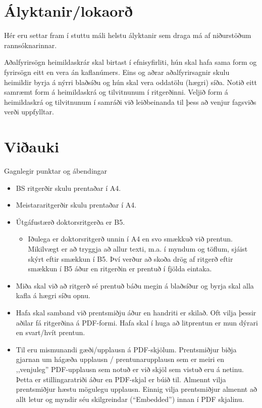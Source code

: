 \documentclass[a4paper, 12pt, twoside]{scrreprt}
\begin{document}
\chapter{Ályktanir/lokaorð}
Hér eru settar fram í stuttu máli helstu ályktanir sem draga má af niðurstöðum rannsóknarinnar.


%
%
\printbibliography[heading=bibintoc] %

Aðalfyrirsögn heimildaskrár skal birtast í efnisyfirliti, hún skal hafa sama form og fyrirsögn eitt en vera án kaflanúmers. Eins og aðrar aðalfyrirsagnir skulu heimildir byrja á nýrri blaðsíðu og hún skal vera oddatölu (hægri) síða.
Notið eitt samræmt form á heimildaskrá og tilvitnunum í ritgerðinni. Veljið form á heimildaskrá og tilvitnunum í samráði við leiðbeinanda til þess að venjur fagsviðs verði uppfylltar.


%
%
\appendix
\renewcommand{\chaptername}{Viðauki}
\chapter{Viðauki}
Gagnlegir punktar og ábendingar
\begin{itemize}
 \item BS ritgerðir skulu prentaðar í A4.
 \item Meistararitgerðir skulu prentaðar í A4.
 \item Útgáfustærð doktorsritgerða er B5.
\begin{itemize}
 \item[-] Iðulega er doktorsritgerð unnin í A4 en svo smækkuð við prentun. Mikilvægt er að tryggja að allur texti, m.a. í myndum og töflum, sjáist skýrt eftir smækkun í B5. Því verður að skoða drög af ritgerð eftir smækkun í B5 áður en ritgerðin er prentuð í fjölda eintaka.
\end{itemize}

\end{itemize}

\begin{itemize}
 \item Miða skal við að ritgerð sé prentuð báðu megin á blaðsíður og byrja skal alla kafla á hægri síðu opnu.
 \item Hafa skal samband við prentsmiðju áður en handriti er skilað. Oft vilja þessir aðilar fá ritgerðina á PDF-formi. Hafa skal í huga að litprentun er mun dýrari en svart/hvít prentun. 
 \item Til eru mismunandi gæði/upplausn á PDF-skjölum. Prentsmiðjur biðja gjarnan um hágæða upplausn / prentunarupplausn sem er meiri en ,,venjuleg” PDF-upplausn sem notuð er við skjöl sem vistuð eru á netinu. Þetta er stillingaratriði áður en PDF-skjal er búið til. Almennt vilja prentsmiðjur hæstu mögulegu upplausn. Einnig vilja prentsmiðjur almennt að allt letur og myndir séu skilgreindar (“Embedded”) innan í PDF skjalinu.
\end{itemize}
\end{document}
